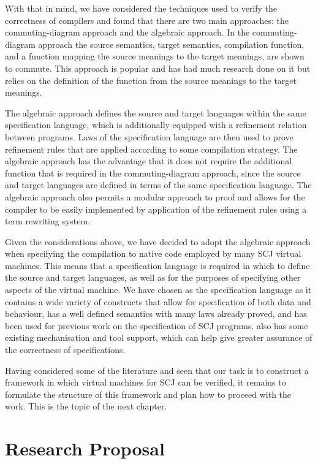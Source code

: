 \documentclass[a4paper,10pt]{report}
\begin{document}
With that in mind, we have considered the techniques used to verify the
correctness of compilers and found that there are two main approaches: the
commuting-diagram approach and the algebraic approach.  In the commuting-diagram
approach the source semantics, target semantics, compilation function, and a
function mapping the source meanings to the target meanings, are shown to
commute.  This approach is popular and has had much research done on it but
relies on the definition of the function from the source meanings to the target
meanings.

The algebraic approach defines the source and target languages within the same
specification language, which is additionally equipped with a refinement
relation between programs.  Laws of the specification language are then used to
prove refinement rules that are applied according to some compilation strategy.
The algebraic approach has the advantage that it does not require the additional
function that is required in the commuting-diagram approach, since the source
and target languages are defined in terms of the same specification language.
The algebraic approach also permits a modular approach to proof and allows for
the compiler to be easily implemented by application of the refinement rules
using a term rewriting system.

Given the considerations above, we have decided to adopt the algebraic approach
when specifying the compilation to native code employed by many SCJ virtual
machines.  This means that a specification language is required in which to
define the source and target languages, as well as for the purposes of
specifying other aspects of the virtual machine.  We have chosen \Circus{} as
the specification language as it contains a wide variety of constructs that
allow for specification of both data and behaviour, has a well defined semantics
with many laws already proved, and has been used for previous work on the
specification of SCJ programs. \Circus{} also has some existing mechanisation
and tool support, which can help give greater assurance of the correctness of
specifications.

Having considered some of the literature and seen that our task is to construct
a framework in which virtual machines for SCJ can be verified, it remains to
formulate the structure of this framework and plan how to proceed with the
work.  This is the topic of the next chapter.

\chapter{Research Proposal}
\label{research-proposal-chapter}
\end{document}
